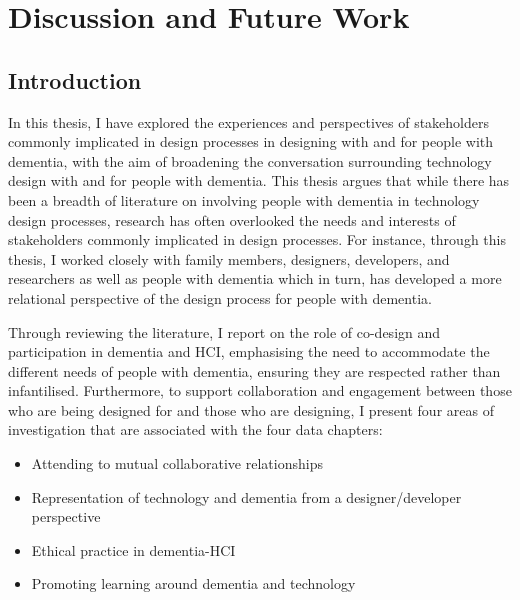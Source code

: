 \chapter{Discussion and Future Work}
\label{Discussion}

\section{Introduction}
\label{Discussion:Intro}

In this thesis, I have explored the experiences and perspectives of stakeholders commonly implicated in design processes in designing with and for people with dementia, with the aim of broadening the conversation surrounding technology design with and for people with dementia. This thesis argues that while there has been a breadth of literature on involving people with dementia in technology design processes, research has often overlooked the needs and interests of stakeholders commonly implicated in design processes. For instance, through this thesis, I worked closely with family members, designers, developers, and researchers as well as people with dementia which in turn, has developed a more relational perspective of the design process for people with dementia.

Through reviewing the literature, I report on the role of co-design and participation in dementia and HCI, emphasising the need to accommodate the different needs of people with dementia, ensuring they are respected rather than infantilised. Furthermore, to support collaboration and engagement between those who are being designed for and those who are designing, I present four areas of investigation that are associated with the four data chapters: 
\begin{itemize}
    \item Attending to mutual collaborative relationships
    \item Representation of technology and dementia from a designer/developer perspective
    \item Ethical practice in dementia-HCI
    \item Promoting learning around dementia and technology
\end{itemize}

